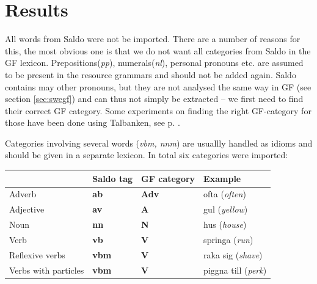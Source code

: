 \documentclass{report}
\begin{document}


\section{Results}
\label{sec:saldoRes}
All words from Saldo were not be imported. There are a number of reasons
for this, the most obvious one is that we do not want all categories from
Saldo in the GF lexicon. Prepositions(\emph{pp}), numerals(\emph{nl}),
personal pronouns etc.
are assumed to be present in the resource grammars and should not be added again.
Saldo contains may other pronouns,
but they are not analysed the same way in GF (see section \ref{sec:swegf}) and
can thus not simply be extracted -- we first need to find their correct GF category.
Some experiments on finding
the right GF-category for those have been done using Talbanken, see p. \pageref{sec:gf.quant}.

Categories involving several words (\emph{vbm, nnm})
are usuallly handled as idioms and should be given in a separate lexicon. In
total six categories were imported: \\

\begin{tabular}{|l|lll|}
\hline
& Saldo tag & GF category & Example \\
\hline
 Adverb & \textbf{ab} &\textbf{Adv} & ofta (\emph{often})\\
 Adjective&\textbf{av} &    \textbf{A} & gul (\emph{yellow})\\
 Noun & \textbf{nn} &\textbf{N} & hus (\emph{house})\\
 Verb & \textbf{vb} &\textbf{V} & springa (\emph{run})\\
 Reflexive verbs  &\textbf{vbm}& \textbf{V} & raka sig (\emph{shave})\\
 Verbs with particles &\textbf{vbm}& \textbf{V}  &  piggna till (\emph{perk})\\
\hline
\end{tabular}\\
\end{document}

